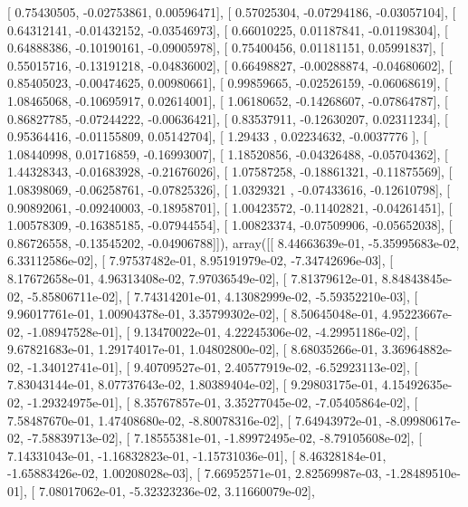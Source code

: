 \documentclass{article}
\begin{document}
       [ 0.75430505, -0.02753861,  0.00596471],
       [ 0.57025304, -0.07294186, -0.03057104],
       [ 0.64312141, -0.01432152, -0.03546973],
       [ 0.66010225,  0.01187841, -0.01198304],
       [ 0.64888386, -0.10190161, -0.09005978],
       [ 0.75400456,  0.01181151,  0.05991837],
       [ 0.55015716, -0.13191218, -0.04836002],
       [ 0.66498827, -0.00288874, -0.04680602],
       [ 0.85405023, -0.00474625,  0.00980661],
       [ 0.99859665, -0.02526159, -0.06068619],
       [ 1.08465068, -0.10695917,  0.02614001],
       [ 1.06180652, -0.14268607, -0.07864787],
       [ 0.86827785, -0.07244222, -0.00636421],
       [ 0.83537911, -0.12630207,  0.02311234],
       [ 0.95364416, -0.01155809,  0.05142704],
       [ 1.29433   ,  0.02234632, -0.0037776 ],
       [ 1.08440998,  0.01716859, -0.16993007],
       [ 1.18520856, -0.04326488, -0.05704362],
       [ 1.44328343, -0.01683928, -0.21676026],
       [ 1.07587258, -0.18861321, -0.11875569],
       [ 1.08398069, -0.06258761, -0.07825326],
       [ 1.0329321 , -0.07433616, -0.12610798],
       [ 0.90892061, -0.09240003, -0.18958701],
       [ 1.00423572, -0.11402821, -0.04261451],
       [ 1.00578309, -0.16385185, -0.07944554],
       [ 1.00823374, -0.07509906, -0.05652038],
       [ 0.86726558, -0.13545202, -0.04906788]]), array([[  8.44663639e-01,  -5.35995683e-02,   6.33112586e-02],
       [  7.97537482e-01,   8.95191979e-02,  -7.34742696e-03],
       [  8.17672658e-01,   4.96313408e-02,   7.97036549e-02],
       [  7.81379612e-01,   8.84843845e-02,  -5.85806711e-02],
       [  7.74314201e-01,   4.13082999e-02,  -5.59352210e-03],
       [  9.96017761e-01,   1.00904378e-01,   3.35799302e-02],
       [  8.50645048e-01,   4.95223667e-02,  -1.08947528e-01],
       [  9.13470022e-01,   4.22245306e-02,  -4.29951186e-02],
       [  9.67821683e-01,   1.29174017e-01,   1.04802800e-02],
       [  8.68035266e-01,   3.36964882e-02,  -1.34012741e-01],
       [  9.40709527e-01,   2.40577919e-02,  -6.52923113e-02],
       [  7.83043144e-01,   8.07737643e-02,   1.80389404e-02],
       [  9.29803175e-01,   4.15492635e-02,  -1.29324975e-01],
       [  8.35767857e-01,   3.35277045e-02,  -7.05405864e-02],
       [  7.58487670e-01,   1.47408680e-02,  -8.80078316e-02],
       [  7.64943972e-01,  -8.09980617e-02,  -7.58839713e-02],
       [  7.18555381e-01,  -1.89972495e-02,  -8.79105608e-02],
       [  7.14331043e-01,  -1.16832823e-01,  -1.15731036e-01],
       [  8.46328184e-01,  -1.65883426e-02,   1.00208028e-03],
       [  7.66952571e-01,   2.82569987e-03,  -1.28489510e-01],
       [  7.08017062e-01,  -5.32323236e-02,   3.11660079e-02],
\end{document}
